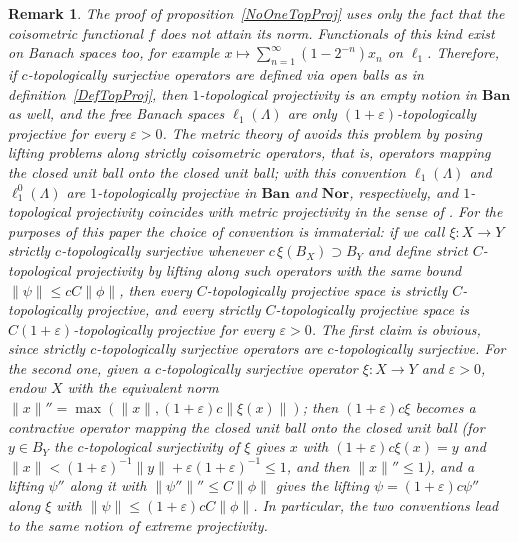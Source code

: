 \documentclass[12pt]{article}
\newtheorem{remark}[theorem]{Remark}
\newcommand{\Nor}{\mathbf{Nor}}
\newcommand{\Ban}{\mathbf{Ban}}
\newcommand{\lo}[1]{\ell_1^0(#1)}
\newcommand{\ellone}[1]{\ell_1(#1)}
\newcommand{\norm}[1]{\lVert #1\rVert}
\begin{document}
\begin{remark}\label{RemarkStrictConvention} The proof of
    proposition~\ref{NoOneTopProj} uses only the fact that the coisometric
    functional $f$ does not attain its norm. Functionals of this kind exist on
    Banach spaces too, for example $x\mapsto\sum_{n=1}^\infty(1-2^{-n})x_n$ on
    $\ell_1$. Therefore, if $c$-topologically surjective operators are defined
    via open balls as in definition~\ref{DefTopProj}, then $1$-topological
    projectivity is an empty notion in $\Ban$ as well, and the free Banach
    spaces $\ellone{\Lambda}$ are only $(1+\varepsilon)$-topologically projective
    for every $\varepsilon>0$. The metric theory of \cite{HelMetrFrQMod} avoids
    this problem by posing lifting problems along strictly coisometric
    operators, that is, operators mapping the closed unit ball onto the closed
    unit ball; with this convention $\ellone{\Lambda}$ and $\lo{\Lambda}$ are
    $1$-topologically projective in $\Ban$ and $\Nor$, respectively, and
    $1$-topological projectivity coincides with metric projectivity in the
    sense of \cite{HelMetrFrQMod}. For the purposes of this paper
    the choice of convention is immaterial: if we call $\xi:X\to Y$ strictly
    $c$-topologically surjective whenever $c\,\xi(B_X)\supset B_Y$ and define
    strict $C$-topological projectivity by lifting along such operators with
    the same bound $\norm{\psi}\leq cC\norm{\phi}$, then every
    $C$-topologically projective space is strictly $C$-topologically projective,
    and every strictly $C$-topologically projective space is
    $C(1+\varepsilon)$-topologically projective for every $\varepsilon>0$. The
    first claim is obvious, since strictly $c$-topologically surjective
    operators are $c$-topologically surjective. For the second one, given a
    $c$-topologically surjective operator $\xi:X\to Y$ and $\varepsilon>0$,
    endow $X$ with the equivalent norm
    $\norm{x}''=\max(\norm{x},(1+\varepsilon)c\norm{\xi(x)})$; then
    $(1+\varepsilon)c\xi$ becomes a contractive operator mapping the closed
    unit ball onto the closed unit ball (for $y\in B_Y$ the $c$-topological
    surjectivity of $\xi$ gives $x$ with $(1+\varepsilon)c\xi(x)=y$ and
    $\norm{x}<(1+\varepsilon)^{-1}\norm{y}+\varepsilon(1+\varepsilon)^{-1}\leq 1$,
    and then $\norm{x}''\leq 1$), and a lifting $\psi''$ along it with
    $\norm{\psi''}''\leq C\norm{\phi}$ gives the lifting
    $\psi=(1+\varepsilon)c\psi''$ along $\xi$ with
    $\norm{\psi}\leq(1+\varepsilon)cC\norm{\phi}$. In particular, the two
    conventions lead to the same notion of extreme projectivity.
\end{remark}
\end{document}
